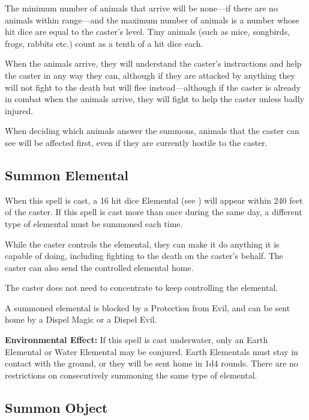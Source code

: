 \begin{multicols*}{2}
The minimum number of animals that arrive will be none—if there are no animals within range—and the maximum number of animals is a number whose hit dice are equal to the caster’s level. Tiny animals (such as mice, songbirds, frogs, rabbits etc.) count as a tenth of a hit dice each.

When the animals arrive, they will understand the caster’s instructions and help the caster in any way they can, although if they are attacked by anything they will not fight to the death but will flee instead—although if the caster is already in combat when the animals arrive, they will fight to help the caster unless badly injured.

When deciding which animals answer the summons, animals that the caster can see will be affected first, even if they are currently hostile to the caster.

\subsection{Summon Elemental}\label{spell:Summon Elemental}

When this spell is cast, a 16 hit dice Elemental (see ) will appear within 240 feet of the caster. If this spell is cast more than once during the same day, a different type of elemental must be summoned each time.

While the caster controls the elemental, they can make it do anything it is capable of doing, including fighting to the death on the caster’s behalf. The caster can also send the controlled elemental home.

The caster does not need to concentrate to keep controlling the elemental.

A summoned elemental is blocked by a Protection from Evil, and can be sent home by a Dispel Magic or a Dispel Evil.

\textbf{Environmental Effect:} If this spell is cast underwater, only an Earth Elemental or Water Elemental may be conjured. Earth Elementals must stay in contact with the ground, or they will be sent home in 1d4 rounds. There are no restrictions on consecutively summoning the same type of elemental.

\subsection{Summon Object}\label{spell:Summon Object}
\end{multicols*}

